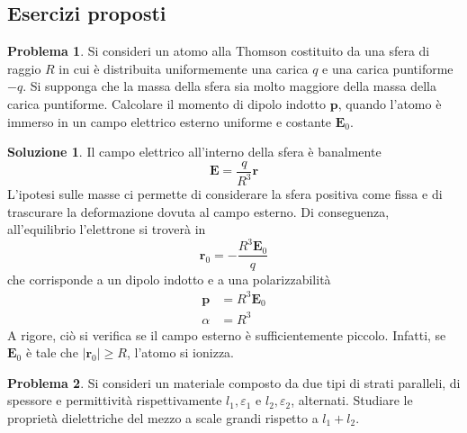 \documentclass[a4paper,11pt]{book}
\renewcommand{\vec}[1]{\mathbf{#1}}
\theoremstyle{theorem}
\theoremstyle{definition}
\newtheorem{problema}{Problema}[section]
\newtheorem{soluzione}{Soluzione}[section]
\begin{document}
\subsection{Esercizi proposti}
\begin{problema}
	Si consideri un atomo alla Thomson costituito da una sfera di raggio $R$ in cui è distribuita uniformemente una carica $q$ e una carica puntiforme $-q$. Si supponga che la massa della sfera sia molto maggiore della massa della carica puntiforme. Calcolare il momento di dipolo indotto $\vec{p}$, quando l'atomo è immerso in un campo elettrico esterno uniforme e costante $\vec{E}_0$.
\end{problema}
\begin{soluzione}
	Il campo elettrico all'interno della sfera è banalmente
	\[\vec{E}=\frac{q}{R^3}\vec{r}\]
	L'ipotesi sulle masse ci permette di considerare la sfera positiva come fissa e di trascurare la deformazione dovuta al campo esterno. Di conseguenza, all'equilibrio l'elettrone si troverà in
	\[\vec{r}_0=-\frac{R^3\vec{E}_0}{q}\]
	che corrisponde a un dipolo indotto e a una polarizzabilità
	\begin{align*}\vec{p}&=R^3\vec{E}_0\\\alpha&=R^3\end{align*}
	A rigore, ciò si verifica se il campo esterno è sufficientemente piccolo. Infatti, se $\vec{E}_0$ è tale che $|\vec{r}_0|\geq R$, l'atomo si ionizza. 
\end{soluzione}
\begin{problema}
	Si consideri un materiale composto da due tipi di strati paralleli, di spessore e permittività rispettivamente $l_1, \varepsilon_1$ e $l_2,\varepsilon_2$, alternati. Studiare le proprietà dielettriche del mezzo a scale grandi rispetto a $l_1+l_2$.
\end{problema}
\end{document}
